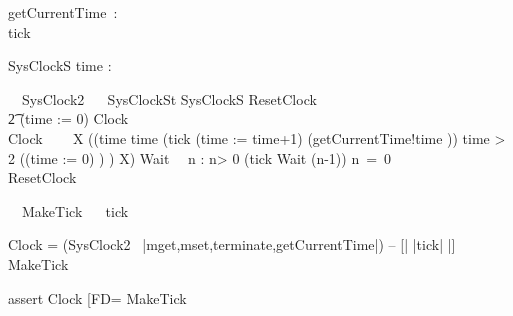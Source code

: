 
\begin{circus}
  \circchannel getCurrentTime~:~\nat\\
  \circchannel tick
\end{circus}

\begin{schema}{SysClockS}
 time : \nat
\end{schema}

\begin{circus}%
  \circprocess\ ~SysClock2 ~\circdef~\circbegin
  \circstate SysClockSt  SysClockS
  ResetClock ~\circdef~
  \\\t2  (time := 0) \circseq Clock\\
  Clock ~\circdef~ 
  \circmu~X \circspot 
    ((\circif time  \circthen \Skip
        \circelse time  \circthen (tick \then (time := time+1) \interleave (getCurrentTime!time \then \Skip))
        \circelse time > 2 \circthen ((time := 0) \circseq \Skip) 
        \circfi) \circseq X)
  Wait~\circdef~ \circvar n : \nat \circspot
   \circif n> 0 \circthen (tick \then Wait (n-1))
   \circelse n~=~0 \circthen \Skip
   \circfi\\
  \circspot ResetClock
  \circend
\end{circus}
\begin{circus}
\circprocess\ ~MakeTick ~\circdef~\circbegin
\circspot tick \then \Skip
\circend
\end{circus}

Clock = 
  (SysClock2 \ {|mget,mset,terminate,getCurrentTime|}) 
  -- [| {|tick|} |] MakeTick 

assert Clock [FD= MakeTick

